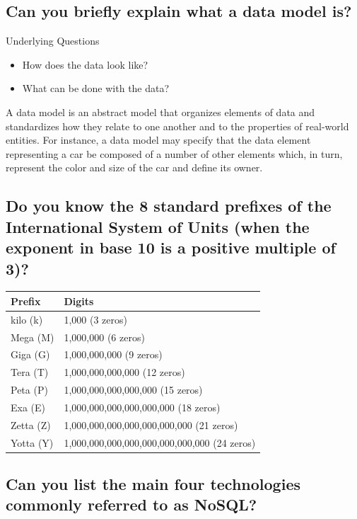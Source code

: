 \documentclass{article}
\begin{document}
\subsection{Can you briefly explain what a data model is?}

Underlying Questions

\begin{itemize}
    \item How does the data look like?
    \item What can be done with the data?
\end{itemize}

\noindent A data model is an abstract model that organizes elements of data and standardizes how they relate to one another and to the properties of real-world entities. For instance, a data model may specify that the data element representing a car be composed of a number of other elements which, in turn, represent the color and size of the car and define its owner.

\subsection{Do you know the 8 standard prefixes of the International System of Units (when the exponent in base 10 is a positive multiple of 3)?}

\begin{table}[H]
\begin{tabular}{|l|l|}
\hline
\textbf{Prefix} & \textbf{Digits} \\ \hline
kilo (k) & 1,000 (3 zeros) \\ \hline
Mega (M) & 1,000,000 (6 zeros) \\ \hline
Giga (G) & 1,000,000,000 (9 zeros) \\ \hline
Tera (T) & 1,000,000,000,000 (12 zeros) \\ \hline
Peta (P) & 1,000,000,000,000,000 (15 zeros) \\ \hline
Exa (E) & 1,000,000,000,000,000,000 (18 zeros) \\ \hline
Zetta (Z) & 1,000,000,000,000,000,000,000 (21 zeros) \\ \hline
Yotta (Y) & 1,000,000,000,000,000,000,000,000 (24 zeros) \\ \hline
\end{tabular}
\end{table}

\subsection{Can you list the main four technologies commonly referred to as NoSQL?}
\end{document}
